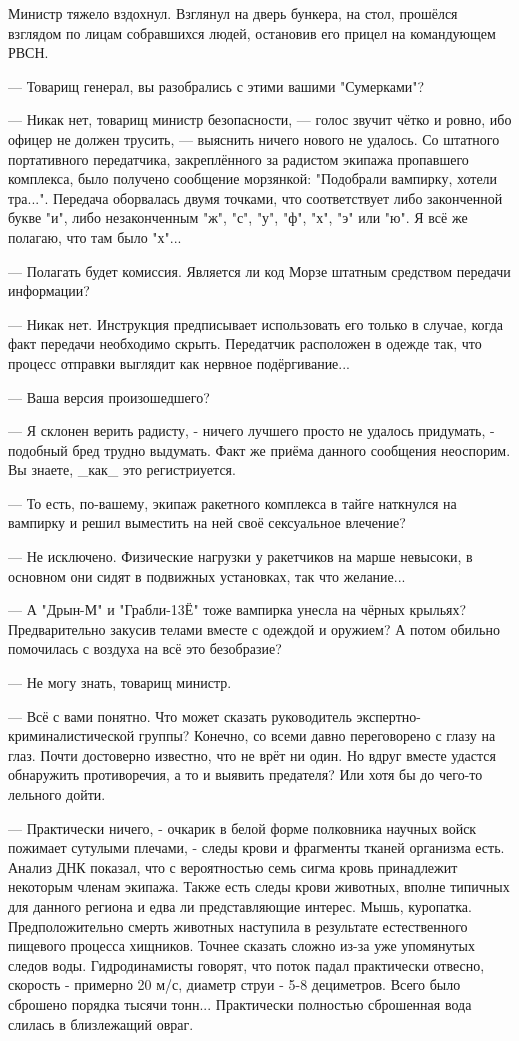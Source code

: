 Министр тяжело вздохнул. Взглянул на дверь бункера, на стол, прошёлся взглядом по лицам собравшихся людей,
остановив его прицел на командующем РВСН.

--- Товарищ генерал, вы разобрались с этими вашими "Сумерками"?

--- Никак нет, товарищ министр безопасности, --- голос звучит чётко и ровно, ибо офицер не должен трусить,
--- выяснить ничего нового не удалось. Со штатного портативного передатчика,
закреплённого за радистом экипажа пропавшего комплекса, было получено сообщение морзянкой:
"Подобрали вампирку, хотели тра...". Передача оборвалась двумя точками, что соответствует либо законченной букве "и",
либо незаконченным "ж", "с", "у", "ф", "х", "э" или "ю". Я всё же полагаю, что там было "х"...

--- Полагать будет комиссия. Является ли код Морзе штатным средством передачи информации?

--- Никак нет. Инструкция предписывает использовать его только в случае, когда факт передачи необходимо скрыть.
Передатчик расположен в одежде так, что процесс отправки выглядит как нервное подёргивание...

--- Ваша версия произошедшего?

--- Я склонен верить радисту, - ничего лучшего просто не удалось придумать, - подобный бред трудно выдумать.
 Факт же приёма данного сообщения неоспорим. Вы знаете, \_как\_ это регистриуется.

--- То есть, по-вашему, экипаж ракетного комплекса в тайге наткнулся на вампирку и решил выместить на ней своё сексуальное влечение?

--- Не исключено. Физические нагрузки у ракетчиков на марше невысоки, в основном они сидят в подвижных установках, так что желание...

--- А "Дрын-М" и "Грабли-13Ё" тоже вампирка унесла на чёрных крыльях? Предварительно закусив телами вместе с одеждой и оружием? А потом обильно помочилась с воздуха на всё это безобразие?

--- Не могу знать, товарищ министр.

--- Всё с вами понятно. Что может сказать руководитель экспертно-криминалистической группы?
Конечно, со всеми давно переговорено с глазу на глаз. Почти достоверно известно, что не врёт ни один. Но вдруг вместе удастся обнаружить противоречия, а то и выявить предателя? Или хотя бы до чего-то лельного дойти.

--- Практически ничего, - очкарик в белой форме полковника научных войск пожимает сутулыми плечами, - следы крови и фрагменты тканей организма есть. Анализ ДНК показал, что с вероятностью семь сигма кровь принадлежит некоторым членам экипажа. Также есть следы крови животных, вполне типичных для данного региона и едва ли представляющие интерес. Мышь, куропатка. Предположительно смерть животных наступила в результате естественного пищевого процесса хищников. Точнее сказать сложно из-за уже упомянутых следов воды. Гидродинамисты говорят, что поток падал практически отвесно, скорость - примерно 20 м/с, диаметр струи - 5-8 дециметров. Всего было сброшено порядка тысячи тонн... Практически полностью сброшенная вода слилась в близлежащий овраг.

